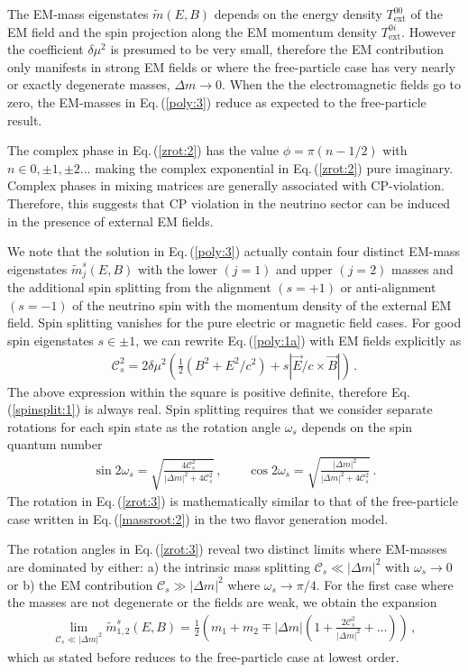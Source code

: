 \documentclass{ws-ijmpa}
\newcommand{\req}[1]{Eq.\,(\ref{#1})}
\begin{document}
The EM-mass eigenstates $\widetilde m(E,B)$ depends on the energy density $T_\mathrm{ext}^{00}$ of the EM field and the spin projection along the EM momentum density $T_\mathrm{ext}^{0i}$. However the coefficient $\delta\mu^{2}$ is presumed to be very small, therefore the EM contribution only manifests in strong EM fields or where the free-particle case has very nearly or exactly degenerate masses, $\Delta m\to 0$. When the the electromagnetic fields go to zero, the EM-masses in \req{poly:3} reduce as expected to the free-particle result.

The complex phase in \req{zrot:2} has the value $\phi=\pi(n-1/2)$ with $n\in0,\pm1,\pm2...$ making the complex exponential in \req{zrot:2} pure imaginary. Complex phases in mixing matrices are generally associated with CP-violation. Therefore, this suggests that CP violation in the neutrino sector can be induced in the presence of external EM fields.

We note that the solution in \req{poly:3} actually contain four distinct EM-mass eigenstates $\widetilde m_{j}^{s}(E,B)$ with the lower $(j=1)$ and upper $(j=2)$ masses and the additional spin splitting from the alignment $(s=+1)$ or anti-alignment $(s=-1)$ of the neutrino spin with the momentum density of the external EM field. Spin splitting vanishes for the pure electric or magnetic field cases. For good spin eigenstates $s\in\pm1$, we can rewrite \req{poly:1a} with EM fields explicitly as
\begin{align}
\label{spinsplit:1}
\mathcal{C}^{2}_{s}=2\delta\mu^{2}\left(\frac{1}{2}(B^{2}+E^{2}/c^{2})+s|\vec{E}/c\times\vec{B}|\right)\,.
\end{align}
The above expression within the square is positive definite, therefore \req{spinsplit:1} is always real. Spin splitting requires that we consider separate rotations for each spin state as the rotation angle $\omega_{s}$ depends on the spin quantum number
\begin{align}
\label{zrot:3}
\sin2\omega_{s}=\sqrt{\frac{4\mathcal{C}_{s}^{2}}{|\Delta m|^{2}+4\mathcal{C}_{s}^{2}}}\,,\qquad
\cos2\omega_{s}=\sqrt{\frac{|\Delta m|^{2}}{|\Delta m|^{2}+4\mathcal{C}_{s}^{2}}}\,.
\end{align}
The rotation in \req{zrot:3} is mathematically similar to that of the free-particle case written in \req{massroot:2} in the two flavor generation model.

The rotation angles in \req{zrot:3} reveal two distinct limits where EM-masses are dominated by either: a) the intrinsic mass splitting $\mathcal{C}_{s}\ll|\Delta m|^{2}$ with $\omega_{s}\rightarrow0$ or b) the EM contribution $\mathcal{C}_{s}\gg|\Delta m|^{2}$ where $\omega_{s}\rightarrow\pi/4$.
For the first case where the masses are not degenerate or the fields are weak, we obtain the expansion
\begin{align}
\label{series:1}
\lim_{\mathcal{C}_{s}\ll|\Delta m|^{2}}\widetilde m_{1,2}^{s}(E,B)=\frac{1}{2}\left(m_{1}+m_{2}\mp|\Delta m|\left(1+\frac{2\mathcal{C}_{s}^{2}}{|\Delta m|^{2}}+\ldots\right)\right)\,,
\end{align}
which as stated before reduces to the free-particle case at lowest order.
\end{document}
